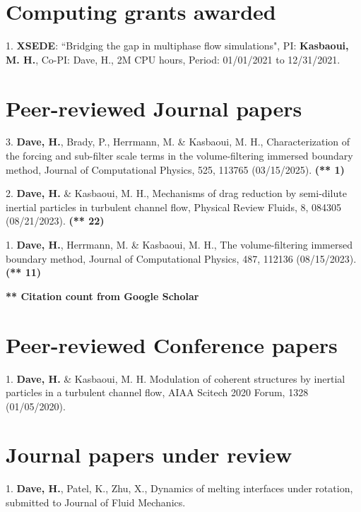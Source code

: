 \documentclass[letterpaper,10.8pt]{article}
\begin{document}
\section{Computing grants awarded}
\begin{description}
\item {1. \textbf{XSEDE}: ``Bridging the gap in multiphase flow simulations", PI: \textbf{Kasbaoui, M. H.}, Co-PI: Dave, H., 2M CPU hours, Period: 01/01/2021 to 12/31/2021.} 
\end{description}

\section{Peer-reviewed Journal papers}
\begin{description}
\item {3. \textbf{Dave, H.}, Brady, P., Herrmann, M. \& Kasbaoui, M. H., Characterization of the forcing and sub-filter scale terms in the volume-filtering immersed boundary method, Journal of Computational Physics, 525, 113765 (03/15/2025). \textbf{(** 1)}}
\item {2. \textbf{Dave, H.} \& Kasbaoui, M. H., Mechanisms of drag reduction by semi-dilute inertial particles in turbulent channel flow, Physical Review Fluids, 8, 084305 (08/21/2023). \textbf{(** 22)}}
\item {1. \textbf{Dave, H.}, Herrmann, M. \& Kasbaoui, M. H., The volume-filtering immersed boundary method, Journal of Computational Physics, 487, 112136 (08/15/2023). \textbf{(** 11)}}
\end{description}
\textbf{** Citation count from Google Scholar}

\section{Peer-reviewed Conference papers}
\begin{description}
\item {1. \textbf{Dave, H.} \& Kasbaoui, M. H. Modulation of coherent structures by inertial particles in a turbulent channel flow, AIAA Scitech 2020 Forum, 1328 (01/05/2020).} 
\end{description}

\section{Journal papers under review}
\begin{description}
\item {1. \textbf{Dave, H.}, Patel, K., Zhu, X., Dynamics of melting interfaces under rotation, submitted to Journal of Fluid Mechanics.}
\end{description}
\end{document}
